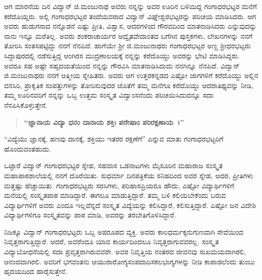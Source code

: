 ಆಗ ಮಾರನೆಯ ದಿನ ವಿದ್ವಾನ್ ಜಿ.ಮಂಜುನಾಥ ಅವರು ನನ್ನನ್ನು ಅವರ ಊರಿನ ಬಳಿಯಿದ್ದ ಗಂಗಾಧರಭಟ್ಟರ ಮನೆಗೆ ಕರೆದೊಯ್ದರು. ಅಲ್ಲಿ ಗಂಗಾಧರಭಟ್ಟರ ತಂದೆಯವರಾದ ವಿದ್ವಾನ್ ವಿಘ್ನೇಶ್ವರಭಟ್ಟರನ್ನು ಪರಿಚಯ ಮಾಡಿಸಿದರು. ಆಗ ಅವರು ಹುಡುಗನಾದ ನನ್ನೊಡನೆ ಎಷ್ಟು ಪ್ರೀತಿ, ವಿಶ್ವಾಸ, ಆದರಗಳಿಂದ ಗೌರವದಿಂದ ಮಾತನಾಡಿಸಿದರು ಎನ್ನುವುದನ್ನು ನಾನು ಇನ್ನೂ ಮರೆತಿಲ್ಲ. ಅವರು ಶಂಕರಾಚಾರ್ಯರ ಅದ್ವೈತವೇದಾಂತದ ಬಗೆಗಿನ ಪುಸ್ತಕಗಳು, ಲೇಖನಗಳನ್ನು ನನಗೆ ತೋರಿಸಿ ಸಂತಸಪಟ್ಟಿದ್ದು ನನಗೆ ನೆನಪಿದೆ. ಹಾಗೆಯೇ ಶ್ರೀ ಜಿ.ಮಂಜುನಾಥರು ಗಂಗಾಧರಭಟ್ಟರ ಅಣ್ಣ ಶ್ರೀಧರಭಟ್ಟರು ಸಿದ್ದಾಪುರದಲ್ಲಿ ನಡೆಸುತ್ತಿದ್ದ ಆಂಗಿರಸ ಮುದ್ರಣಾಲಯಕ್ಕೆ ನನ್ನನ್ನು ಕರೆದೊಯ್ದು ಅವರನ್ನು ಭೇಟಿ ಮಾಡಿಸಿದ್ದರು. ಅವರೂ ಸಹ ಅಷ್ಟೇ ಸಹೃದಯತೆಯಿಂದ ನನ್ನನ್ನು ಗೌರವಿಸಿ ಮಾತನಾಡಿಸಿದುದು ನನಗಿನ್ನೂ ನೆನಪಿದೆ. ವಿದ್ವಾನ್ ಜಿ.ಮಂಜುನಾಥರು ನನಗೆ ಆತ್ಮೀಯ ಸ್ನೇಹಿತರು. ಅವರು ಆಗ ಉತ್ತರಕನ್ನಡದ ಎಷ್ಟೋ ಜಾಗಗಳಿಗೆ ಕರೆದೊಯ್ದು ಅಲ್ಲಿನ ವನಸಿರಿ, ಪ್ರಾಕೃತಿಕ ಸಂಪತ್ತುಗಳನ್ನು ತೋರಿಸುವುದರ ಜೊತೆಗೆ ತಮ್ಮ ಮನೆಗೂ ಕರೆದೊಯ್ದು ಆದರಾತಿಥ್ಯವನ್ನು ನೀಡಿ, ತಮ್ಮ ಊರಿನವರಿಗೆ ನನ್ನನ್ನು ಒಬ್ಬ ಉತ್ತಮ ಸಂಸ್ಕೃತ ವಿದ್ವಾಂಸನೆಂದು ಪರಿಚಯಿಸಿದುದನ್ನೂ ಸದಾ ನೆನಪಿಸಿಕೊಳ್ಳುತ್ತೇನೆ.
\begin{verse}
\textbf{“ಜ್ಞಾನಾಯ ವಿದ್ಯಾ ಧನಂ ದಾನಾಯ ಶಕ್ತಿಃ ಪರೇಷಾಂ ಪರಿರಕ್ಷಣಾಯ~।”}
\end{verse}
“ವಿದ್ಯೆಯು ಜ್ಞಾನಕ್ಕೆ, ಹಣವು ದಾನಕ್ಕೆ, ಶಕ್ತಿಯು ಇತರರ ರಕ್ಷಣೆಗೆ” ಎನ್ನುವ ಮಾತು ಗಂಗಾಧರಭಟ್ಟರಿಗೆ ಹೊಂದುವಂತಹುದು.

ಒಟ್ಟಾರೆ ವಿದ್ವಾನ್ ಗಂಗಾಧರಭಟ್ಟರ ಸ್ನೇಹ, ಸಹವಾಸ ಒಡನಾಟಗಳು ಮೈಸೂರಿನ ಮಹಾರಾಜ ಸಂಸ್ಕೃತ ಮಹಾಪಾಠಶಾಲೆಯಲ್ಲಿ ನನಗೆ ದೊರೆಯಿತು. ಸುಧರ್ಮಾ ದಿನಪತ್ರಿಕೆಯ ಸನಿಹದಿಂದ ಅವರ ಸ್ನೇಹ, ಆದರ, ಪ್ರೀತಿಗಳು ಮತ್ತಷ್ಟು ಹೆಚ್ಚಾಯಿತು. ಗಂಗಾಧರಭಟ್ಟರು ಸರಸಿಗಳು, ಪರಿಹಾಸಪ್ರಿಯರೂ ಹೌದು, ಎಷ್ಟೋ ವಿದ್ಯಾರ್ಥಿಗಳಿಗೆ ಮನೆಯಲ್ಲಿ ಸಂಸ್ಕೃತಪಾಠ ಮಾಡಿದ್ದಾರೆ. ಈಗಲೂ ಮಾಡುತ್ತಿದ್ದಾರೆ. ತಮ್ಮ ಬಳಿ ಕಲಿಯಬೇಕೆಂದು ಬರುವ ವಿದ್ಯಾರ್ಥಿಗಳಿಗೆ ಅವರು ಎಂದೂ ಇಲ್ಲವೆನ್ನದೆ ಸಂಸ್ಕೃತ ವಿದ್ಯೆಯನ್ನು ಕಲಿಸಿದ್ದಾರೆ, ಕಲಿಸುತ್ತಿದ್ದಾರೆ. ಎಷ್ಟೋ ಜನ ವಿದೇಶಿ ವಿದ್ಯಾರ್ಥಿಗಳಿಗೂ ಸಂಸ್ಕೃತವನ್ನು ಪಾಠ ಮಾಡಿ, ಅವರನ್ನು ತರಬೇತಿಗೊಳಿಸಿದ್ದಾರೆ. 

ನಿಜಕ್ಕೂ ವಿದ್ವಾನ್ ಗಂಗಾಧರಭಟ್ಟರು ಒಬ್ಬ ಅಪರೂಪದ ವ್ಯಕ್ತಿ. ಅವರು ಕಾಲಧರ್ಮಕ್ಕನುಗುಣವಾಗಿ ಸೇವೆಯಿಂದ ನಿವೃತ್ತರಾಗುತ್ತಿದ್ದಾರೆ. ಆದರೆ, ಅವರೆಂದೂ ಯಾವ ಕಾರ್ಯದಿಂದಲೂ ನಿವೃತ್ತರಾಗುವವರಲ್ಲ. ಸಂಸ್ಕೃತ ವಿದ್ಯಾಬೋಧನೆಯಲ್ಲಿ ಸದಾ ಪ್ರವೃತ್ತರಾಗಿರುವವರೇ. ಅವರ ನಿವೃತ್ತಿಯ ನಂತರದ ಜೀವನವು ಸುಖಮಯವಾಗಿರಲಿ, ಆನಂದವಾಗಿರಲಿ. ಅವರಿಗೆ ಭಗವಂತನು ಆಯುರಾರೋಗ್ಯಸಂಪದಾದಿಸಕಲಭಾಗ್ಯಗಳನ್ನು ನೀಡಿ ಕಾಪಾಡಲೆಂದು ತುಂಬು ಹೃದಯದಿಂದ ಹಾರೈಸುತ್ತೇನೆ.

\articleend
